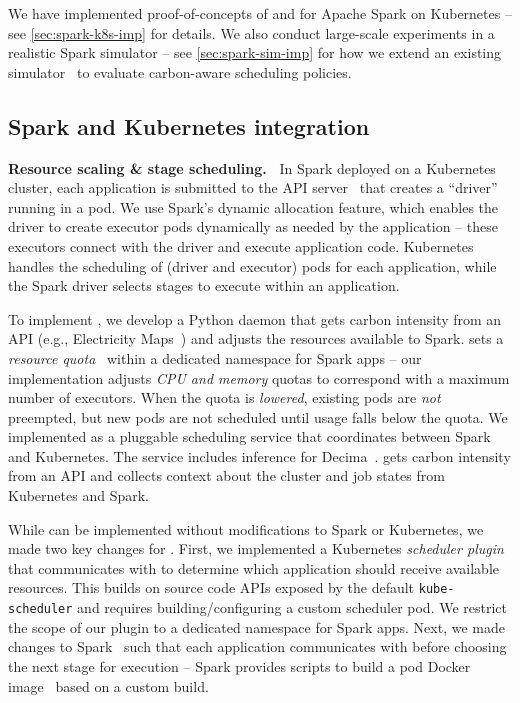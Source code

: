 \noindent We have implemented proof-of-concepts of \DANISH and \CAP for Apache Spark on Kubernetes -- see \autoref{sec:spark-k8s-imp} for details.  
We also conduct large-scale experiments in a realistic Spark simulator -- see \autoref{sec:spark-sim-imp} for how we extend an existing simulator~\cite{Hongzi:2019:Decima} to evaluate carbon-aware scheduling policies.
\vspace{-0.5em}

\subsection{Spark and Kubernetes integration} \label{sec:spark-k8s-imp}

\noindent \textbf{Resource scaling \& stage scheduling.\ }
In Spark deployed on a Kubernetes cluster, 
each application is submitted to the API server~\cite{k8s:2015} that creates a ``driver'' running in a pod.  
We use Spark's dynamic allocation feature, which enables the driver to create executor pods dynamically as needed by the application -- these executors connect with the driver and execute application code. 
Kubernetes handles the scheduling of (driver and executor) pods for each application, while the Spark driver selects stages to execute within an application.


To implement \CAP, we develop a Python daemon that gets carbon intensity from an API (e.g., Electricity Maps~\cite{electricity-map}) and adjusts the resources available to Spark.  \CAP sets a \textit{resource quota}~\cite{kubernetesResourceQuotas} within a dedicated namespace for Spark apps -- our implementation adjusts \textit{CPU and memory} quotas to correspond with a maximum number of executors.  When the quota is \textit{lowered}, existing pods are \textit{not} preempted, but new pods are not scheduled until usage falls below the quota.  
We implemented \DANISH as a pluggable scheduling service that coordinates between Spark and Kubernetes. 
The service includes inference for Decima~\cite{Hongzi:2019:Decima}. 
\DANISH gets carbon intensity from an API and collects context about the cluster and job states from Kubernetes and Spark.




While \CAP can be implemented without modifications to Spark or Kubernetes, we made two key changes for \DANISH.
First, we implemented a Kubernetes \textit{scheduler plugin}~\cite{k8s-scheduler-plugins:21} that communicates with \DANISH to determine which application should receive available resources.  
This builds on source code APIs exposed by the default \verb|kube-scheduler| and requires building/configuring a custom scheduler pod.  We restrict the scope of our plugin to a dedicated namespace for Spark apps.
Next, we made changes to Spark~\cite{Spark:16} such that each application communicates with \DANISH before choosing the next stage for execution -- Spark provides scripts to build a pod Docker image~\cite{Merkel:14:Docker} based on a custom build.

